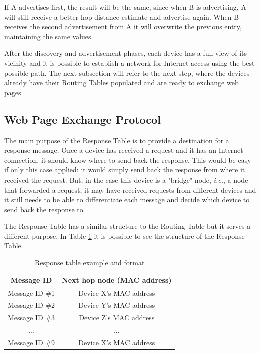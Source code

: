 If A advertises first, the result will be the same, since when B is advertising, A will still receive a better hop distance estimate and advertise again. When B receives the second advertisement from A it will overwrite the previous entry, maintaining the same values.

After the discovery and advertisement phases, each device has a full view of its vicinity and it is possible to establish a network for Internet access using the best possible path. The next subsection will refer to the next step, where the devices already have their Routing Tables populated and are ready to exchange web pages.

\subsection{Web Page Exchange Protocol}
\label{subsec:exch}


The main purpose of the Response Table is to provide a destination for a response message. Once a device has received a request and it has an Internet connection, it should know where to send back the response. This would be easy if only this case applied: it would simply send back the response from where it received the request. But, in the case this device is a "bridge" node, \textit{i.e.}, a node that forwarded a request, it may have received requests from different devices and it still needs to be able to differentiate each message and decide which device to send back the response to.

The Response Table has a similar structure to the Routing Table but it serves a different purpose. In Table \ref{tab:rspTables} it is possible to see the structure of the Response Table.

\begin{table}[ht]
\centering
\bgroup
\def\arraystretch{2.5}
\begin{tabular}{|c|c|}
\hline
\textbf{Message ID} & \textbf{Next hop node (MAC address)} \\ \hline
Message ID \#1 & Device X's MAC address \\ \hline
Message ID \#2 & Device Y's MAC address \\ \hline
Message ID \#3 & Device Z's MAC address \\ \hline
... & ... \\ \hline
Message ID \#9 & Device X's MAC address \\ \hline
\end{tabular}
\egroup
\caption{Response table example and format}
\label{tab:rspTables}
\end{table}

